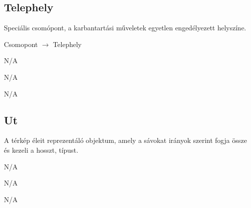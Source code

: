 \subsection{Telephely}
\begin{class-template-responsibility}
    Speciális csomópont, a karbantartási műveletek egyetlen engedélyezett helyszíne.
\end{class-template-responsibility}
\begin{class-template-baseclass}
    Csomopont $\rightarrow$ Telephely
\end{class-template-baseclass}
\begin{class-template-interface}
    N/A
\end{class-template-interface}
\begin{class-template-attribute}
    N/A
\end{class-template-attribute}
\begin{class-template-method}
    N/A
\end{class-template-method}

\subsection{Ut}
\begin{class-template-responsibility}
    A térkép éleit reprezentáló objektum, amely a sávokat irányok szerint fogja össze és kezeli a hosszt, típust.
\end{class-template-responsibility}
\begin{class-template-baseclass}
    N/A
\end{class-template-baseclass}
\begin{class-template-interface}
    N/A
\end{class-template-interface}
\begin{class-template-attribute}
\end{class-template-attribute}
\begin{class-template-method}
    N/A
\end{class-template-method}

